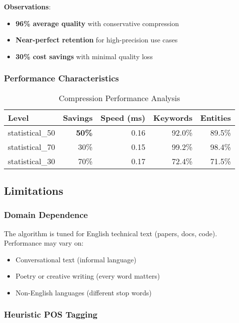 \textbf{Observations}:
\begin{itemize}
    \item \textbf{96\% average quality} with conservative compression
    \item \textbf{Near-perfect retention} for high-precision use cases
    \item \textbf{30\% cost savings} with minimal quality loss
\end{itemize}

\subsubsection{Performance Characteristics}

\begin{table}[h]
\centering
\caption{Compression Performance Analysis}
\label{tab:compression-performance}
\begin{tabular}{lrrrr}
\toprule
Level & Savings & Speed (ms) & Keywords & Entities \\
\midrule
statistical\_50 & \textbf{50\%} & 0.16 & 92.0\% & 89.5\% \\
statistical\_70 & 30\% & 0.15 & 99.2\% & 98.4\% \\
statistical\_30 & 70\% & 0.17 & 72.4\% & 71.5\% \\
\bottomrule
\end{tabular}
\end{table}

\subsection{Limitations}

\subsubsection{Domain Dependence}

The algorithm is tuned for English technical text (papers, docs, code). Performance may vary on:
\begin{itemize}
    \item Conversational text (informal language)
    \item Poetry or creative writing (every word matters)
    \item Non-English languages (different stop words)
\end{itemize}

\subsubsection{Heuristic POS Tagging}

